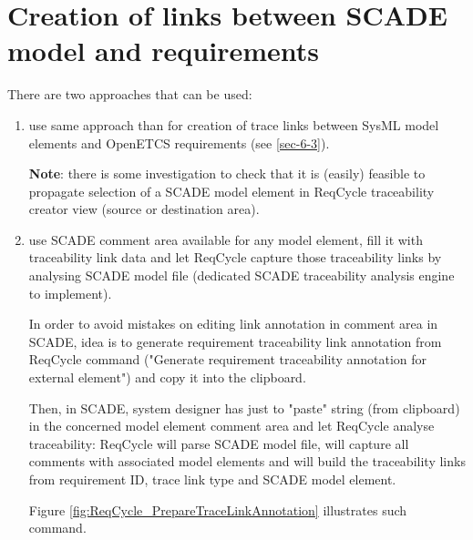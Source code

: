 \documentclass[11pt]{template/openetcs_report}
\begin{document}
\section{Creation of links between SCADE model and requirements}
\label{sec-6-4}
There are two approaches that can be used: 
\begin{enumerate}
\item use same approach than for creation of trace links between SysML model elements and OpenETCS requirements (see \ref{sec-6-3}).

\textbf{Note}: there is some investigation to check that it is (easily) feasible to propagate selection of a SCADE model element in ReqCycle traceability creator view (source or destination area).

\item use SCADE comment area available for any model element, fill it with traceability link data and let ReqCycle capture those traceability links by analysing SCADE model file (dedicated SCADE traceability analysis engine to implement). 

In order to avoid mistakes on editing link annotation in comment area in SCADE, idea is to generate requirement traceability link annotation from ReqCycle command ("Generate requirement traceability annotation for external element") and copy it into the clipboard. 

Then, in SCADE, system designer has just to "paste" string (from clipboard) in the concerned model element comment area and let ReqCycle analyse traceability: ReqCycle will parse SCADE model file, will capture all comments with associated model elements and will build the traceability links from requirement ID, trace link type and SCADE model element.


Figure \ref{fig:ReqCycle_PrepareTraceLinkAnnotation} illustrates such command.

\end{enumerate} 
\end{document}
